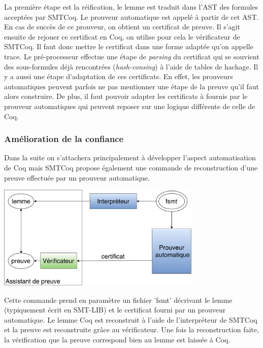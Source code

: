 \documentclass[11pt]{article}
\begin{document}
La première étape est la réification, le lemme est traduit dans l'AST des formules acceptées par SMTCoq. Le prouveur automatique est appelé à partir de cet AST. En cas de succès de ce prouveur, on obtient un certificat de preuve. 
Il s'agit ensuite de rejouer ce certificat en Coq, on utilise pour cela le vérificateur de SMTCoq. Il faut donc mettre le certificat dans une forme adaptée qu'on appelle trace. Le pré-processeur effectue une étape de \textit{parsing} du certificat qui se souvient des sous-formules déjà rencontrées (\textit{hash-consing}) à l'aide de tables de hachage.  Il y a aussi une étape d'adaptation de ces certificats. En effet, les prouveurs automatiques peuvent parfois ne pas mentionner une étape de la preuve qu'il faut alors construire. De plus, il faut pouvoir adapter les certificats à fournis par le prouveur automatiques qui peuvent reposer sur une logique différente de celle de Coq. \\





\subsubsection{Amélioration de la confiance} \label{confiance}

Dans la suite on s'attachera principalement à développer l'aspect automatisation de Coq mais SMTCoq propose également une commande de reconstruction d'une preuve effectuée par un prouveur automatique.

\begin{center}
\includegraphics[height=5cm]{Confiance.pdf}
\end{center}

Cette commande prend en paramètre un fichier 'fsmt' décrivant le lemme (typiquement écrit en SMT-LIB) et le certificat fourni par un prouveur automatique. Le lemme Coq est reconstruit à l'aide de l'interpréteur de SMTCoq et la preuve est reconstruite grâce au vérificateur. Une fois la reconstruction faite, la vérification que la preuve correspond bien au lemme est laissée à Coq. \\
\end{document}
